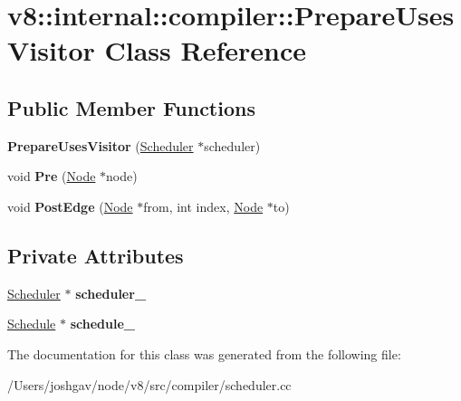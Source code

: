 \hypertarget{classv8_1_1internal_1_1compiler_1_1_prepare_uses_visitor}{}\section{v8\+:\+:internal\+:\+:compiler\+:\+:Prepare\+Uses\+Visitor Class Reference}
\label{classv8_1_1internal_1_1compiler_1_1_prepare_uses_visitor}
\subsection*{Public Member Functions}
\begin{DoxyCompactItemize}
\item 
{\bfseries Prepare\+Uses\+Visitor} (\hyperlink{classv8_1_1internal_1_1compiler_1_1_scheduler}{Scheduler} $\ast$scheduler)\hypertarget{classv8_1_1internal_1_1compiler_1_1_prepare_uses_visitor_a92415be051233353ff6920119c31fb94}{}\label{classv8_1_1internal_1_1compiler_1_1_prepare_uses_visitor_a92415be051233353ff6920119c31fb94}

\item 
void {\bfseries Pre} (\hyperlink{classv8_1_1internal_1_1compiler_1_1_node}{Node} $\ast$node)\hypertarget{classv8_1_1internal_1_1compiler_1_1_prepare_uses_visitor_a9a10984ad35e1433a1e633b48301d717}{}\label{classv8_1_1internal_1_1compiler_1_1_prepare_uses_visitor_a9a10984ad35e1433a1e633b48301d717}

\item 
void {\bfseries Post\+Edge} (\hyperlink{classv8_1_1internal_1_1compiler_1_1_node}{Node} $\ast$from, int index, \hyperlink{classv8_1_1internal_1_1compiler_1_1_node}{Node} $\ast$to)\hypertarget{classv8_1_1internal_1_1compiler_1_1_prepare_uses_visitor_af0b4a0f7171f69b1a38c2189252d6b59}{}\label{classv8_1_1internal_1_1compiler_1_1_prepare_uses_visitor_af0b4a0f7171f69b1a38c2189252d6b59}

\end{DoxyCompactItemize}
\subsection*{Private Attributes}
\begin{DoxyCompactItemize}
\item 
\hyperlink{classv8_1_1internal_1_1compiler_1_1_scheduler}{Scheduler} $\ast$ {\bfseries scheduler\+\_\+}\hypertarget{classv8_1_1internal_1_1compiler_1_1_prepare_uses_visitor_a0d980ee2308a00b91070e3c76279e410}{}\label{classv8_1_1internal_1_1compiler_1_1_prepare_uses_visitor_a0d980ee2308a00b91070e3c76279e410}

\item 
\hyperlink{classv8_1_1internal_1_1compiler_1_1_schedule}{Schedule} $\ast$ {\bfseries schedule\+\_\+}\hypertarget{classv8_1_1internal_1_1compiler_1_1_prepare_uses_visitor_ab26d528f84af3041a78621a10208cfea}{}\label{classv8_1_1internal_1_1compiler_1_1_prepare_uses_visitor_ab26d528f84af3041a78621a10208cfea}

\end{DoxyCompactItemize}


The documentation for this class was generated from the following file\+:\begin{DoxyCompactItemize}
\item 
/\+Users/joshgav/node/v8/src/compiler/scheduler.\+cc\end{DoxyCompactItemize}
